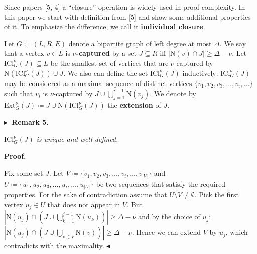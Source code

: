 Since papers [5, 4] a “closure” operation is widely used in proof complexity. In this
paper we start with definition from [5] and show some additional properties of it. To emphasize the
difference, we call it \textbf{individual closure}.\par




Let $G\coloneqq(L,R,E)$ denote a bipartite graph of left degree at most $\Delta$. We say that a
vertex $v\in L$ is $\nu$\textbf{-captured} by a set $J\subseteq R$ iff $|\mathrm{N}\left(v\right)\cap J|\geq\Delta-\nu$. Let $\mathrm{ICl}_{G}^{\nu}\left(J\right)\subseteq L$ be the smallest set of vertices that are $\nu$-captured
by $\mathrm{N}\left(\mathrm{ICl}_{G}^{\nu}\left(J\right)\right)\cup J$. We also can define the set $\mathrm{ICl}_{G}^{\nu}\left(J\right)$ inductively:
$\mathrm{ICl}_{G}^{\nu}\left(J\right)$ may be considered as a maximal sequence of distinct vertices $\{v_{1},v_{2},v_{3},\dots,v_{i},\dots\}$ such that $v_{i}$ is $\nu$-captured by $J\cup\bigcup\limits_{j=1}^{i-1}\mathrm{N}\left(v_{j}\right)$. We
denote by $\mathrm{Ext}_{G}^{\nu}\left(J\right)\coloneqq J\cup\mathrm{N}\left(\mathrm{ICl%
}_{G}^{\nu}\left(J\right)\right)$ the \textbf{extension} of $J$.\par





\par\medskip\noindent\textbf{
$\blacktriangleright$ Remark 5.
}\par



$\mathrm{ICl}_{G}^{\nu}\left(J\right)$\emph{ is unique and well-defined.}\par







\par\medskip\noindent\textbf{Proof.}\par




Fix some set $J$. Let $V\coloneqq\{v_{1},v_{2},v_{3},\dots,v_{i},\dots,v_{|V|}\}$ and $U\coloneqq\{u_{1},u_{2},u_{3},\dots,u_{i},\dots,u_{|U|}\}$ be two sequences that satisfy the required properties. For the sake of
contradiction assume that $U\setminus V\neq\emptyset$. Pick the first vertex $u_{j}\in U$ that does
not appear in $V$. But $|\mathrm{N}\left(u_{j}\right)\cap(J\cup\bigcup\limits_{k=1}^{j-1}\mathrm{N}%
\left(u_{k}\right))|\geq\Delta-\nu$ and by the choice of $u_{j}$: $|\mathrm{N}\left(u_{j}\right)\cap(J\cup\bigcup\limits_{v\in V}\mathrm{N}\left(%
v\right))|\geq\Delta-\nu$. Hence we can extend $V$ by $u_{j}$, which contradicts with the maximality.
$\blacktriangleleft$\par



